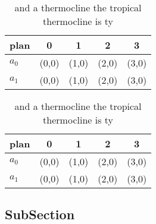 \documentclass[a4paper]{article}
\begin{document}
\begin{table}
\begin{adjustbox}{width=0.7\columnwidth}
\begin{tabular}{|l|l|l|l|l|}
\hline
\textbf{plan} & \multicolumn{1}{c|}{\textbf{0}} & \multicolumn{1}{c|}{\textbf{1}} & \multicolumn{1}{c|}{\textbf{2}} & \multicolumn{1}{c|}{\textbf{3}} \\ \hline
\textbf{$a_0$}  & (0,0) & (1,0) & (2,0) & (3,0) \\ \hline
\textbf{$a_1$}  & (0,0) & (1,0) & (2,0) & (3,0) \\ \hline
\end{tabular}
\end{adjustbox}
\caption{ and a thermocline the tropical thermocline is ty
}
\end{table}

\begin{table}
\begin{adjustbox}{width=0.7\columnwidth}
\begin{tabular}{|l|l|l|l|l|}
\hline
\textbf{plan} & \multicolumn{1}{c|}{\textbf{0}} & \multicolumn{1}{c|}{\textbf{1}} & \multicolumn{1}{c|}{\textbf{2}} & \multicolumn{1}{c|}{\textbf{3}} \\ \hline
\textbf{$a_0$}  & (0,0) & (1,0) & (2,0) & (3,0) \\ \hline
\textbf{$a_1$}  & (0,0) & (1,0) & (2,0) & (3,0) \\ \hline
\end{tabular}
\end{adjustbox}
\caption{ and a thermocline the tropical thermocline is ty
}
\end{table}

\subsection{SubSection}
\end{document}
